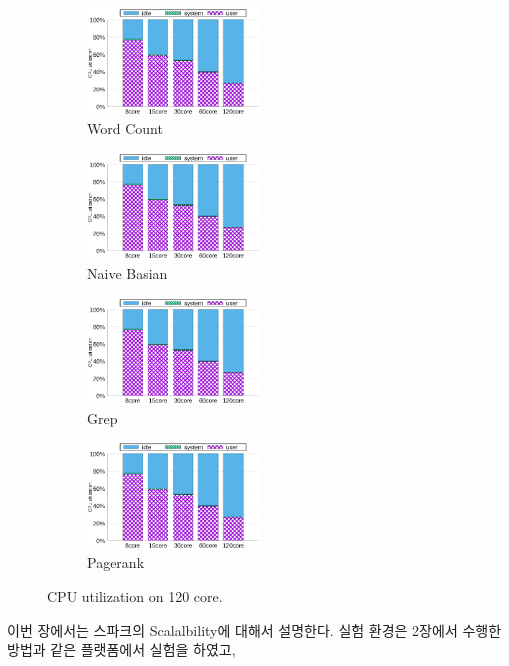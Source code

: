\begin{figure}[tb]
    \centering
    \begin{subfigure}[b]{0.25\textwidth}
        \includegraphics[width=1.8in]{graph/wc_cpuutils.eps}
        \caption{Word Count}
    \end{subfigure}%
    \begin{subfigure}[b]{0.25\textwidth}
        \includegraphics[width=1.8in]{graph/wc_cpuutils.eps}
        \caption{Naive Basian}
    \end{subfigure}%
    \begin{subfigure}[b]{0.25\textwidth}
        \includegraphics[width=1.8in]{graph/wc_cpuutils.eps}
        \caption{Grep}
    \end{subfigure}%
        \begin{subfigure}[b]{0.25\textwidth}
        \includegraphics[width=1.8in]{graph/wc_cpuutils.eps}
        \caption{Pagerank}
    \end{subfigure}
        \centering
    \caption{CPU utilization on 120 core.}
    \label{fig:utilization2}
\end{figure}


\ifkor
이번 장에서는 스파크의 Scalalbility에 대해서 설명한다. 실험 환경은 2장에서 수행한 방법과
같은 플랫폼에서 실험을 하였고, 
\else

